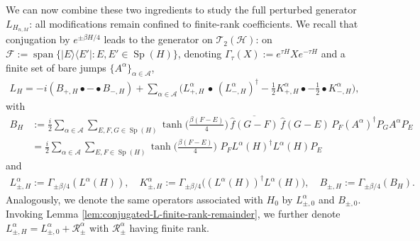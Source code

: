 \documentclass[11pt]{amsart}
\newcommand{\1}{\mathbbm{1}}
\newcommand{\cH}{\mathcal{H}}
\theoremstyle{plain}
\theoremstyle{definition}
\theoremstyle{remark}
\numberwithin{equation}{section}
\begin{document}
\noindent We can now combine these two ingredients to study the full perturbed generator $L_{H_{n,M}}$: all modifications remain confined to finite-rank coefficients. We recall that conjugation by $e^{\pm\beta H/4}$ leads to the generator on $\mathscr{T}_2(\cH)$: on $\mathscr F:=\operatorname{span}\{|E\rangle\langle E'|:E,E'\in\operatorname{Sp}(H)\}$, denoting $\Gamma_\tau(X):=e^{\tau H}Xe^{-\tau H}$ and a finite set of bare jumps $\{A^\alpha\}_{\alpha\in\mathcal{A}}$,
\begin{align*}
L_{H}
=
-i(B_{+,H}\bullet -\bullet B_{-,H})
+\sum_{\alpha\in\mathcal A}
\Big(L^\alpha_{+,H}\,\bullet\,(L^\alpha_{-,H})^\dagger-\tfrac12 K^\alpha_{+,H}\bullet -\tfrac12 \bullet K^\alpha_{-,H}\Big),
\end{align*}
with 
\begin{align}
B_H&:=\frac{i}{2}\sum_{\alpha\in\mathcal A}\sum_{E,F,G\in\operatorname{Sp}(H)}
\tanh\!\Big(\frac{\beta(F-E)}{4}\Big)\,
\overline{\widehat f(G-F)}\,\widehat f(G-E)\,
P_{F}(A^\alpha)^\dagger P_GA^\alpha P_E\nonumber \\
&=\frac{i}{2}\sum_{\alpha\in\mathcal A}\sum_{E,F\in\operatorname{Sp}(H)}
\tanh\!\Big(\frac{\beta(F-E)}{4}\Big)\,\,
P_{F}L^\alpha(H)^\dagger L^\alpha(H) P_E\label{BHexpressionLa}
\end{align}
and
\begin{align}
L^\alpha_{\pm,H}:=\Gamma_{\pm\beta/4}(L^\alpha(H)),
\quad
K^\alpha_{\pm,H}:=\Gamma_{\pm\beta/4}\big((L^\alpha(H))^\dagger L^\alpha(H)\big),\quad B_{\pm,H}:=\Gamma_{\pm\beta/4}(B_H).\label{pmallneededops}
\end{align} 
Analogously, we denote the same operators associated with $H_0$ by $L_{\pm,0}^\alpha$ and $B_{\pm,0}$. Invoking Lemma \ref{lem:conjugated-L-finite-rank-remainder}, we further denote $L_{\pm,H}^\alpha=L_{\pm,0}^\alpha+\mathcal R_\pm^\alpha$ with \(\mathcal R_\pm^\alpha\) having finite rank.
\end{document}
